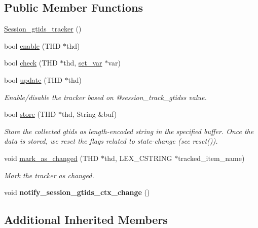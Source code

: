 \subsection*{Public Member Functions}
\begin{DoxyCompactItemize}
\item 
\mbox{\hyperlink{classSession__gtids__tracker_aab77dd31ff4b4101881c55f040615d07}{Session\+\_\+gtids\+\_\+tracker}} ()
\item 
bool \mbox{\hyperlink{classSession__gtids__tracker_a170e0e7c09b4a143c7f3f6e710b435ce}{enable}} (T\+HD $\ast$thd)
\item 
bool \mbox{\hyperlink{classSession__gtids__tracker_a92148b2f6afc9101d8a56b35525491ed}{check}} (T\+HD $\ast$thd, \mbox{\hyperlink{classset__var}{set\+\_\+var}} $\ast$var)
\item 
bool \mbox{\hyperlink{classSession__gtids__tracker_a02f3fb9545c5dfbedb9022f55ce03e6c}{update}} (T\+HD $\ast$thd)
\begin{DoxyCompactList}\small\item\em Enable/disable the tracker based on @session\+\_\+track\+\_\+gtids\textquotesingle{}s value. \end{DoxyCompactList}\item 
bool \mbox{\hyperlink{classSession__gtids__tracker_a35a83c4f0631294a76d707c20d5f1e1f}{store}} (T\+HD $\ast$thd, String \&buf)
\begin{DoxyCompactList}\small\item\em Store the collected gtids as length-\/encoded string in the specified buffer. Once the data is stored, we reset the flags related to state-\/change (see reset()). \end{DoxyCompactList}\item 
void \mbox{\hyperlink{classSession__gtids__tracker_a2c2c7bed399a66fda5748d1a6407b8f8}{mark\+\_\+as\+\_\+changed}} (T\+HD $\ast$thd, L\+E\+X\+\_\+\+C\+S\+T\+R\+I\+NG $\ast$tracked\+\_\+item\+\_\+name)
\begin{DoxyCompactList}\small\item\em Mark the tracker as changed. \end{DoxyCompactList}\item 
\mbox{\label{classSession__gtids__tracker_a9c6d6d35c2bf1f61d220cece56ed2fd5}} 
void {\bfseries notify\+\_\+session\+\_\+gtids\+\_\+ctx\+\_\+change} ()
\end{DoxyCompactItemize}
\subsection*{Additional Inherited Members}


